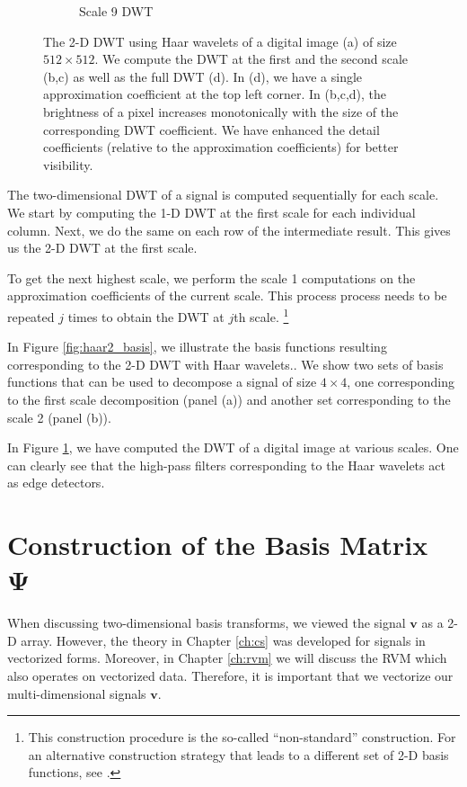 \begin{figure}
\begin{subfigure}{0.4\textwidth}
  \caption{Scale 9 DWT}
\end{subfigure}
\caption[2-D Haar DWT Example]{The 2-D DWT using Haar wavelets of a digital image (a) of size $512\times 512$.
  We compute the DWT at the first and the second scale (b,c) as well as the full DWT (d).
  In (d), we have a single approximation coefficient at the top left corner.
  In (b,c,d), the brightness of a pixel increases monotonically with the size of the corresponding DWT coefficient.
  We have enhanced the detail coefficients (relative to the approximation coefficients) for better visibility.}
\label{fig:dwt2}
\end{figure}


The two-dimensional DWT of a signal is computed sequentially for each scale.
We start by computing the 1-D DWT at the first scale for each individual column.
Next, we do the same on each row of the intermediate result.
This gives us the 2-D DWT at the first scale.

To get the next highest scale, we perform the scale 1 computations on the approximation coefficients of the current scale.
This process process needs to be repeated $j$ times to obtain the DWT at $j$th scale.
\footnote{
  This construction procedure is the so-called ``non-standard'' construction.
  For an alternative construction strategy that leads to a different set of 2-D basis functions, see \cite{stollnitz1995}.
}

In Figure \ref{fig:haar2_basis}, we illustrate the basis functions resulting corresponding to the 2-D DWT with Haar wavelets..
We show two sets of basis functions that can be used to decompose a signal of size $4\times 4$, one corresponding to the first scale decomposition (panel (a)) and another set corresponding to the scale 2 (panel (b)).

In Figure \ref{fig:dwt2}, we have computed the DWT of a digital image at various scales. 
One can clearly see that the high-pass filters corresponding to the Haar wavelets act as edge detectors.

\section{Construction of the Basis Matrix \texorpdfstring{$\bm\Psi$}{[Psi]}}
When discussing two-dimensional basis transforms, we viewed the signal $\bm v$ as a 2-D array.
However, the theory in Chapter \ref{ch:cs} was developed for signals in vectorized forms.
Moreover, in Chapter \ref{ch:rvm} we will discuss the RVM which also operates on vectorized data.
Therefore, it is important that we vectorize our multi-dimensional signals $\bm v$.

